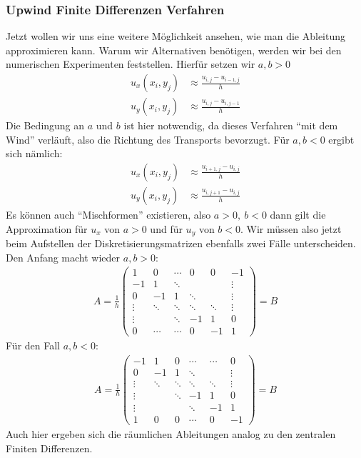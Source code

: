 \documentclass[12pt,a4paper]{scrartcl}
\numberwithin{equation}{section} %
\theoremstyle{definition}
\theoremstyle{plain}
\begin{document}
\subsubsection{Upwind Finite Differenzen Verfahren}
Jetzt wollen wir uns eine weitere Möglichkeit ansehen, wie man die Ableitung approximieren kann. Warum wir Alternativen benötigen, werden wir bei den numerischen Experimenten feststellen. Hierfür setzen wir $a, b >0$
\begin{align}
u_x(x_i,y_j)&\approx\frac{u_{i,j}-u_{i-1,j}}{h}\label{eq:upwind1}\\
u_y(x_i,y_j)&\approx\frac{u_{i,j}-u_{i,j-1}}{h}
\end{align}
Die Bedingung an $a$ und $b$ ist hier notwendig, da dieses Verfahren "`mit dem Wind"' verläuft,  also die Richtung des Transports bevorzugt. Für $a,b <0$ ergibt sich nämlich:
\begin{align}
u_x(x_i,y_j)&\approx\frac{u_{i+1,j}-u_{i,j}}{h}\\
u_y(x_i,y_j)&\approx\frac{u_{i,j+1}-u_{i,j}}{h}\label{eq:upwind2}
\end{align}
Es können auch "`Mischformen"' existieren, also $a>0,~b<0$ dann gilt die Approximation für $u_x$ von $a>0$ und für $u_y$ von $b<0$. Wir müssen also jetzt beim Aufstellen der Diskretisierungsmatrizen ebenfalls zwei Fälle unterscheiden. Den Anfang macht wieder $a,b>0$:
\begin{align}
A=\frac{1}{h}\begin{pmatrix}
1&0&\dotsb&0&0&-1\\
-1&1&\ddots&&&\vdots\\
0&-1&1&\ddots&&\vdots\\
\vdots&\ddots&\ddots&\ddots&\ddots&\vdots\\
\vdots&&\ddots&-1&1&0\\
0&\dotsb&\dotsb&0&-1&1
\end{pmatrix}=B
\end{align}
Für den Fall $a,b<0$:
\begin{align}
A=\frac{1}{h}\begin{pmatrix}
-1&1&0&\dotsb&\dotsb&0\\
0&-1&1&\ddots&&\vdots\\
\vdots&\ddots&\ddots&\ddots&\ddots&\vdots\\
\vdots&&\ddots&-1&1&0\\
\vdots&&&\ddots&-1&1\\
1&0&0&\dotsb&0&-1
\end{pmatrix}=B
\end{align}
Auch hier ergeben sich die räumlichen Ableitungen analog zu den zentralen Finiten Differenzen.
\end{document}
